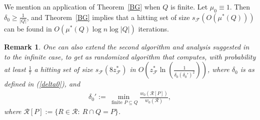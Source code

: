 \documentclass[a4paper,11pt]{article}
\def\cF{\mathcal F}
\def\cR{\mathcal R}
\newcommand{\raf}[1]{(\ref{#1})}
\newtheorem{remark}{Remark}
\begin{document}
We mention an application of Theorem~\ref{BG} when $Q$ is finite. Let $\mu_0\equiv 1$. Then $\delta_0\ge \frac{1}{|Q|}$, and Theorem~\ref{BG} implies that a hitting set of size $s_{\cF}(O(\mu^*(Q)))$ can be found in $O(\mu^*(Q)\log n\log |Q|)$ iterations.

\begin{remark}\label{r1}
	One can also extend the second algorithm and analysis suggested in \cite{AP14} to the infinite case, to get as randomized algorithm that computes, with probability at least $\frac{1}{7}$ a hitting set of size $s_{\cF}(8z_{\cF}^*)$ in $O(z_{\cF}^*\ln(\frac{1}{\delta_0(\delta_0')^2}))$, where $\delta_0$ is as defined in \raf{delta0}, and 
	\begin{align}\label{delta0'}
	\delta_0':=\min_{\text{ finite } P\subseteq Q}\frac{w_0(\cR[P])}{w_0(\cR)},
	\end{align}
	where $\cR[P]:=\{R\in\cR:~R\cap Q= P\}$.
\end{remark}
\fi
\end{document}
